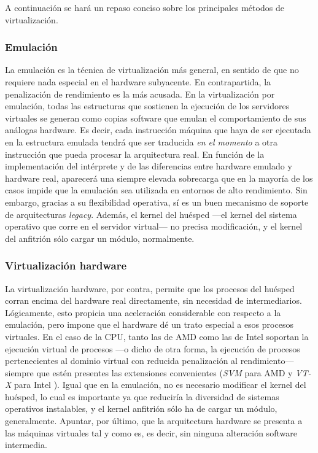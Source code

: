 \noindent A continuaci\'on se har\'a un repaso conciso sobre los principales m\'etodos de virtualizaci\'on.

\subsubsection{Emulaci\'on}\label{subsubsec:emulacion}

\noindent La emulaci\'on es la t\'ecnica de virtualizaci\'on m\'as general, en sentido de que no requiere nada especial en el hardware subyacente. En contrapartida, la penalizaci\'on de rendimiento es la m\'as acusada. En la virtualizaci\'on por emu\-la\-ci\'on, todas las estructuras que sostienen la ejecuci\'on de los servidores virtuales se generan como copias software que emulan el comportamiento de sus an\'alogas hardware. Es decir, cada instrucci\'on m\'aquina que haya de ser ejecutada en la estructura emulada tendr\'a que ser traducida \emph{en el momento} a otra instrucci\'on que pueda procesar la arquitectura real. En funci\'on de la implementaci\'on del int\'erprete y de las diferencias entre hardware emulado y hardware real, aparecer\'a una siempre elevada sobrecarga que en la ma\-yo\-r\'i\-a de los casos impide que la emulaci\'on sea utilizada en entornos de alto rendimiento. Sin embargo, gracias a su flexibilidad operativa, s\'i es un buen mecanismo de soporte de arquitecturas \emph{legacy}. Adem\'as, el kernel del hu\'esped ---el kernel del sistema operativo que corre en el servidor virtual--- no precisa modificaci\'on, y el kernel del anfitri\'on s\'olo cargar un m\'odulo, normalmente.\newline

\subsubsection{Virtualizaci\'on hardware}\label{subsubsec:virthardware}

\noindent La virtualizaci\'on hardware, por contra, permite que los procesos del hu\'esped corran encima del hardware real directamente, sin necesidad de in\-ter\-me\-dia\-rios. L\'ogicamente, esto propicia una aceleraci\'on considerable con respecto a la emulaci\'on, pero impone que el hardware d\'e un trato especial a esos procesos virtuales. En el caso de la CPU, tanto las de AMD como las de Intel soportan la ejecuci\'on virtual de procesos ---o dicho de otra forma, la ejecuci\'on de procesos pertenecientes al dominio virtual con reducida penalizaci\'on al rendimiento--- siempre que est\'en presentes las extensiones convenientes (\emph{SVM} para AMD y \emph{VT-X} para Intel \cite{intelvtx}). Igual que en la emulaci\'on, no es necesario modificar el kernel del hu\'esped, lo cual es importante ya que reducir\'ia la diversidad de sistemas operativos instalables, y el kernel anfitri\'on s\'olo ha de cargar un m\'odulo, ge\-ne\-ral\-men\-te. Apuntar, por \'ultimo, que la arquitectura hardware se presenta a las m\'aquinas virtuales tal y como es, es decir, sin ninguna alteraci\'on software intermedia.\newline

